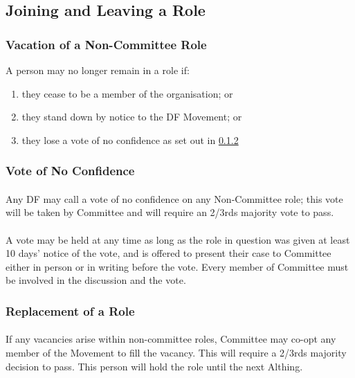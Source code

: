 \documentclass[a4paper, 11pt]{report}
\begin{document}
\subsection{Joining and Leaving a Role}
\subsubsection{Vacation of a Non-Committee Role}
A person may no longer remain in a role if:
\begin{enumerate}[\hspace{0.5cm}(a)]
\item they cease to be a member of the organisation; or
\item they stand down by notice to the DF Movement; or
\item they lose a vote of no confidence as set out in \ref{sec:noncomnocon}
\end{enumerate}

\subsubsection{Vote of No Confidence}
\label{sec:noncomnocon}
\paragraph{} Any DF may call a vote of no confidence on any Non-Committee role; this vote will be taken by Committee and will require an 2/3rds majority vote to pass.
\paragraph{} A vote may be held at any time as long as the role in question was given at least 10 days’ notice of the vote, and is offered to present their case to Committee either in person or in writing before the vote. Every member of Committee must be involved in the discussion and the vote.

\subsubsection{Replacement of a Role}
\paragraph{} If any vacancies arise within non-committee roles, Committee may co-opt any member of the Movement to fill the vacancy. This will require a 2/3rds majority decision to pass. This person will hold the role until the next Althing.
\end{document}
